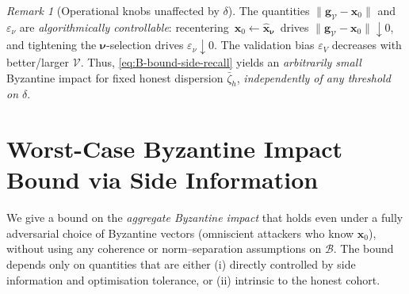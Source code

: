 \documentclass{article}
\theoremstyle{plain}
\theoremstyle{definition}
\theoremstyle{remark}
\newtheorem{remark}[theorem]{Remark}
\begin{document}
\begin{remark}[Operational knobs unaffected by $\delta$]\label{rem:knobs-delta}
The quantities $\|\bm{g}_{\mathcal V}-\bm{x}_0\|$ and $\varepsilon_\nu$ are \emph{algorithmically
controllable}: recentering $\,\bm{x}_0\leftarrow\hat{\bm{x}}_{\bm\nu}\,$ drives
$\|\bm{g}_{\mathcal V}-\bm{x}_0\|\!\downarrow 0$, and tightening the $\bm\nu$-selection drives
$\varepsilon_\nu\!\downarrow 0$. The validation bias $\varepsilon_V$ decreases with better/larger
$\mathcal V$. Thus, \eqref{eq:B-bound-side-recall} yields an \emph{arbitrarily small} Byzantine
impact for fixed honest dispersion $\bar\zeta_h$, \emph{independently of any threshold on $\delta$}.
\end{remark}










\clearpage
\section{Worst-Case Byzantine Impact Bound via Side Information}
\label{sec:worstcase-sideinfo}

We give a bound on the \emph{aggregate Byzantine impact} that holds even under a fully
adversarial choice of Byzantine vectors (omniscient attackers who know $\bm{x}_0$), without
using any coherence or norm–separation assumptions on $\mathcal{B}$. The bound depends only
on quantities that are either (i) directly controlled by side information and optimisation
tolerance, or (ii) intrinsic to the honest cohort.
\end{document}
